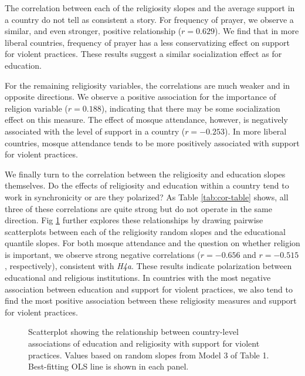 \documentclass[10pt,letterpaper]{article}
\begin{document}
The correlation between each of the religiosity slopes and the average support in a country do not tell as consistent a story. For frequency of prayer, we observe a similar, and even stronger, positive relationship (\(r=0.629\)). We find that in more liberal countries, frequency of prayer has a less conservatizing effect on support for violent practices. These results suggest a similar socialization effect as for education.

For the remaining religiosity variables, the correlations are much weaker and in opposite directions. We observe a positive association for the importance of religion variable (\(r=0.188\)), indicating that there may be some socialization effect on this measure. The effect of mosque attendance, however, is negatively associated with the level of support in a country (\(r=-0.253\)). In more liberal countries, mosque attendance tends to be more positively associated with support for violent practices.

We finally turn to the correlation between the religiosity and education slopes themselves. Do the effects of religiosity and education within a country tend to work in synchronicity or are they polarized? As Table \ref{tab:cor-table} shows, all three of these correlations are quite strong but do not operate in the same direction. Fig \ref{fig:slope-compare-plot} further explores these relationships by drawing pairwise scatterplots between each of the religiosity random slopes and the educational quantile slopes. For both mosque attendance and the question on whether religion is important, we observe strong negative correlations (\(r=-0.656\) and \(r=-0.515\), respectively), consistent with \emph{H4a}. These results indicate polarization between educational and religious institutions. In countries with the most negative association between education and support for violent practices, we also tend to find the most positive association between these religiosity measures and support for violent practices.

\begin{figure}[!h]
\centering
\caption{Scatterplot showing the relationship between country-level associations of education and religiosity with support for violent practices. Values based on random slopes from Model 3 of Table 1. Best-fitting OLS line is shown in each panel.}
\label{fig:slope-compare-plot}
\end{figure}
\end{document}
